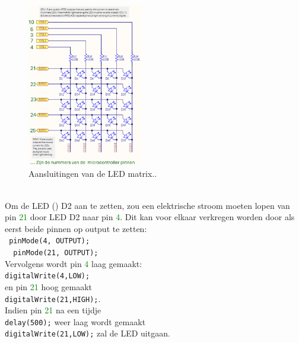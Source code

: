 \begin{minipage}{\linewidth}
	\begin{figure}
		\vspace{-15pt}
		\begin{center}
			\centering
			\captionsetup{justification=centering}
			\includegraphics[width=0.45\textwidth]{figuren/LedMatrixV2Mnr}
		\end{center}
		\caption{Aansluitingen van de LED matrix..}
		\label{fig:ledmtx2}
	\end{figure}
	
~\vspace{5mm}\\
	Om de LED  () D2 aan te zetten, zou een elektrische stroom moeten lopen van  pin  \textcolor {Green}{21} door LED D2 naar pin \textcolor{Green}{4}.
	Dit kan voor elkaar verkregen worden door als eerst beide pinnen op output te zetten:\\
	\lstinline|	pinMode(4, OUTPUT);|\\ \lstinline|	pinMode(21, OUTPUT);|\\
	Vervolgens wordt pin \textcolor {Green}{4} laag gemaakt:\\
	 \lstinline|digitalWrite(4,LOW);|\\ en pin \textcolor {Green}{21} hoog gemaakt\\ \lstinline|digitalWrite(21,HIGH);|.\\
	 Indien pin \textcolor {Green}{21}  na een tijdje\\ \lstinline|delay(500);| weer laag wordt gemaakt\\ \lstinline|digitalWrite(21,LOW);| zal de LED uitgaan.
\end{minipage}


